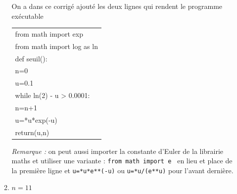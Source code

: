 \begin{enumerate}
\begin{enumerate}
On a dans ce corrigé ajouté les deux lignes qui rendent le programme exécutable

	\begin{center}
		\ttfamily
		\begin{tabularx}{10cm}{|X|}\hline
			from math import exp\\
			from math import log as ln\\
			def seuil():\\
			\quad n=0\\
			\quad u=0.1\\
			\quad while ln(2) - u {\red >} 0.0001:\\
			\quad \quad n=n+1\\
			\quad \quad u={\red 2*u*exp(-u)}\\
			\quad return(u,n)\\ \hline
		\end{tabularx}
	\end{center}

\emph{Remarque :} on peut aussi importer la constante d'Euler de la librairie maths et utiliser une variante :
			\texttt{from math import e } en lieu et place de la première ligne et
			\texttt{u={*u*e**(-u)}} ou \texttt{u={*u/(e**u)}} pour l'avant dernière.
			\item $n = 11$	
		\end{enumerate}
	\end{enumerate}
